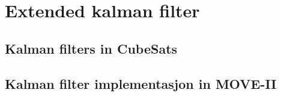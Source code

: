 \chapter{Extended kalman filter}
\label{kalmanFilter}
\section{Kalman filters in CubeSats}
\section{Kalman filter implementasjon in MOVE-II}
